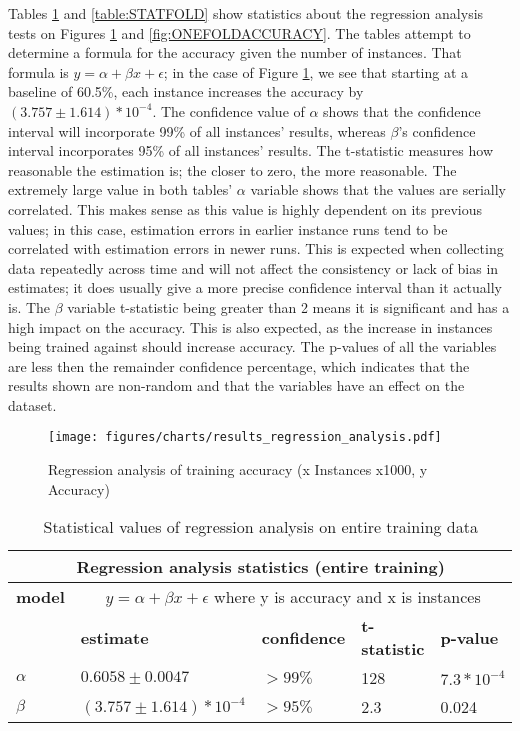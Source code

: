 Tables \ref{table:STATENTIRE} and \ref{table:STATFOLD} show statistics about the 
regression analysis tests on Figures \ref{fig:OVERALLTRAININGACCURACY} and 
\ref{fig:ONEFOLDACCURACY}. The tables attempt to determine a formula for the 
accuracy given the number of instances. That formula is $y = \alpha + \beta x + \epsilon$;
in the case of Figure \ref{fig:OVERALLTRAININGACCURACY}, we see that starting at 
a baseline of 60.5\%, each instance increases the accuracy by $(3.757\pm1.614)*10^{-4}$.
The confidence value of $\alpha$ shows that the confidence interval will 
incorporate 99\% of all instances' results, whereas $\beta$'s confidence interval
incorporates 95\% of all instances' results.  The t-statistic measures how 
reasonable the estimation is; the closer to zero, the more reasonable. The 
extremely large value in both tables' $\alpha$ variable shows that the values are 
serially correlated.  This makes sense as this value is highly dependent on its 
previous values; in this case, estimation errors in earlier instance runs tend to 
be correlated with estimation errors in newer runs. This is expected when 
collecting data repeatedly across time and will not affect the consistency or 
lack of bias in estimates; it does usually give a more precise confidence interval 
than it actually is.  The $\beta$ variable t-statistic being greater than 2 means 
it is significant and has a high impact on the accuracy.  This is also expected, 
as the increase in instances being trained against should increase accuracy. The 
p-values of all the variables are less then the remainder confidence percentage, 
which indicates that the results shown are non-random and that the variables have an 
effect on the dataset.

\begin{figure}[htp]
	\begin{center}
		\texttt{[image: figures/charts/results\_regression\_analysis.pdf]}
		\caption{Regression analysis of training accuracy (x Instances x1000, y Accuracy) \label{fig:OVERALLTRAININGACCURACY}}
	\end{center}
\end{figure}

\begin{table}[htp]
	\begin{tabular}{|l|l|l|l|l|}
		\hline \multicolumn{5}{|c|}{\bf Regression analysis statistics (entire training) } \\ \hline
			{\bf model} & \multicolumn{4}{|c|}{$y = \alpha + \beta x + \epsilon$ where y is accuracy and x is instances} \\ \hline
		            & {\bf estimate} & {\bf confidence} & {\bf t-statistic} & {\bf p-value } \\ \hline
		{\bf $\alpha$}    & $0.6058\pm0.0047$   & $>99\%$            & 128         & $7.3*10^{-4}$ \\ \hline
		{\bf $\beta$}     & $(3.757\pm1.614)*10^{-4}$ & $>95\%$        & 2.3         & 0.024 \\ \hline
		\end{tabular}
		\caption{Statistical values of regression analysis on entire training data}
		\label{table:STATENTIRE}       
\end{table}

